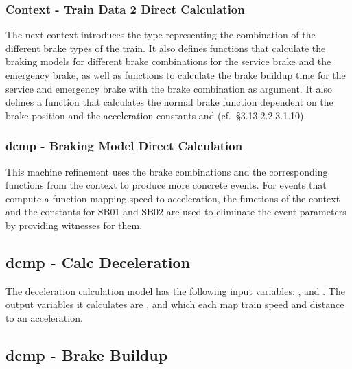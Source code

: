 \documentclass{template/openetcs_article}
\begin{document}
{{\footnotesize

}

\subsubsection{Context - Train Data 2 Direct Calculation}
\label{sec:context-train-data-1}

The next context introduces the type representing the combination of the
different brake types of the train. It also defines functions that calculate the
braking models for different brake combinations for the service brake and the
emergency brake, as well as functions to calculate the brake buildup time for
the service and emergency brake with the brake combination as argument. It also
defines a function that calculates the normal brake function dependent on the
brake position and the acceleration constants  and
 (cf.~§3.13.2.2.3.1.10).

{\footnotesize

}

\subsubsection{dcmp - Braking Model Direct Calculation}
\label{sec:dcmp-braking-model-2}

This machine refinement uses the brake combinations and the corresponding
functions from the context to produce more concrete events. For events that
compute a function mapping speed to acceleration, the functions of the context
and the constants for SB01 and SB02 are used to eliminate the event parameters
by providing witnesses for them.

{\footnotesize

}

\subsection{dcmp - Calc Deceleration}
\label{sec:dcmp-calc-decel}

The deceleration calculation model has the following input variables:
,  and . The output
variables it calculates are ,  and
 which each map train speed and distance to an acceleration.

{\footnotesize

}

\subsection{dcmp - Brake Buildup}
\label{sec:dcmp-brake-buildup}

}
\end{document}
